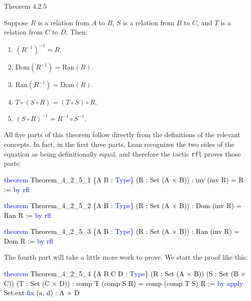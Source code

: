 \documentclass[
  letterpaper,
  DIV=11,
  numbers=noendperiod]{scrreprt}
\makeatletter
\newenvironment{Shaded}{\begin{snugshade}}{\end{snugshade}}
\newcommand{\KeywordTok}[1]{\textcolor[rgb]{0.00,0.23,0.31}{#1}}
\newcommand{\NormalTok}[1]{\textcolor[rgb]{0.00,0.23,0.31}{#1}}
\newcommand{\SpecialCharTok}[1]{\textcolor[rgb]{0.37,0.37,0.37}{#1}}
\newcommand{\WarningTok}[1]{\textcolor[rgb]{0.37,0.37,0.37}{\textit{#1}}}
\providecommand{\tightlist}{%
  \setlength{\itemsep}{0pt}\setlength{\parskip}{0pt}}\usepackage{longtable,booktabs,array}
\def\redsquiggly{\bgroup \markoverwith{\textcolor{red}{\lower3.5\p@\hbox{\sixly \char58}}}\ULon}
\renewcommand{\NormalTok}[1]{\textcolor[HTML]{000000}{#1}}
\renewcommand{\KeywordTok}[1]{\textcolor[HTML]{0000FF}{#1}}
\renewcommand{\SpecialCharTok}[1]{}
\renewcommand{\WarningTok}[1]{\redsquiggly{\textcolor[HTML]{0000FF}{#1}}}
\theoremstyle{remark}
\makeatother
\begin{document}
\begin{nthm}{Theorem 4.2.5}

Suppose \(R\) is a relation from \(A\) to \(B\), \(S\) is a relation
from \(B\) to \(C\), and \(T\) is a relation from \(C\) to \(D\). Then:

\begin{enumerate}
\def\labelenumi{\arabic{enumi}.}
\tightlist
\item
  \((R^{-1})^{-1} = R\).
\item
  \(\mathrm{Dom}(R^{-1}) = \mathrm{Ran}(R)\).
\item
  \(\mathrm{Ran}(R^{-1}) = \mathrm{Dom}(R)\).
\item
  \(T \circ (S \circ R) = (T \circ S) \circ R\).
\item
  \((S \circ R)^{-1} = R^{-1} \circ S^{-1}\).
\end{enumerate}

\end{nthm}

All five parts of this theorem follow directly from the definitions of
the relevant concepts. In fact, in the first three parts, Lean
recognizes the two sides of the equation as being definitionally equal,
and therefore the tactic \texttt{rfl} proves those parts:

\begin{Shaded}
\begin{Highlighting}[]
\KeywordTok{theorem}\NormalTok{ Theorem\_4\_2\_5\_1 \{A B : }\KeywordTok{Type}\NormalTok{\}}
\NormalTok{    (R : Set (A × B)) : inv (inv R) = R := }\KeywordTok{by} \KeywordTok{rfl}

\KeywordTok{theorem}\NormalTok{ Theorem\_4\_2\_5\_2 \{A B : }\KeywordTok{Type}\NormalTok{\}}
\NormalTok{    (R : Set (A × B)) : Dom (inv R) = Ran R := }\KeywordTok{by} \KeywordTok{rfl}

\KeywordTok{theorem}\NormalTok{ Theorem\_4\_2\_5\_3 \{A B : }\KeywordTok{Type}\NormalTok{\}}
\NormalTok{    (R : Set (A × B)) : Ran (inv R) = Dom R := }\KeywordTok{by} \KeywordTok{rfl}
\end{Highlighting}
\end{Shaded}

The fourth part will take a little more work to prove. We start the
proof like this:

\begin{Shaded}
\begin{Highlighting}[]
\KeywordTok{theorem}\NormalTok{ Theorem\_4\_2\_5\_4 \{A B C D : }\KeywordTok{Type}\NormalTok{\}}
\NormalTok{    (R : Set (A × B)) (S : Set (B × C)) (T : Set (C × D)) :}
\NormalTok{    comp T (comp S R) = comp (comp T S) R := }\KeywordTok{by}
  \KeywordTok{apply}\NormalTok{ Set.ext}
  \KeywordTok{fix}\NormalTok{ (a, d) : A × D}
  \SpecialCharTok{**}\WarningTok{done}\SpecialCharTok{::}
\end{Highlighting}
\end{Shaded}
\end{document}

